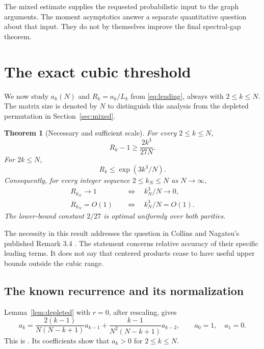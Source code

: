 \documentclass[11pt]{article}
\newtheorem{theorem}{Theorem}[section]
\theoremstyle{definition}
\theoremstyle{remark}
\newcommand{\1}{\mathbf 1}
\begin{document}
The mixed estimate supplies the requested probabilistic input to the graph arguments. The moment asymptotics answer a separate quantitative question about that input. They do not by themselves improve the final spectral-gap theorem.


\clearpage
\section{The exact cubic threshold}\label{sec:threshold}

We now study $a_k(N)$ and $R_k=a_k/L_k$ from \eqref{eq:leading}, always with $2\le k\le N$. The matrix size is denoted by $N$ to distinguish this analysis from the depleted permutation in Section~\ref{sec:mixed}.

\begin{theorem}[Necessary and sufficient scale]\label{thm:threshold}
For every $2\le k\le N$,
\begin{equation}\label{eq:lower}
R_k-1\ge\frac{2k^3}{27N}.
\end{equation}
For $2k\le N$,
\begin{equation}\label{eq:upper}
R_k\le\exp(3k^3/N).
\end{equation}
Consequently, for every integer sequence $2\le k_N\le N$ as $N\to\infty$,
\begin{align}
R_{k_N}\to1&\quad\Longleftrightarrow\quad k_N^3/N\to0,\label{eq:iff}\\
R_{k_N}=O(1)&\quad\Longleftrightarrow\quad k_N^3/N=O(1).\label{eq:bounded}
\end{align}
The lower-bound constant $2/27$ is optimal uniformly over both parities.
\end{theorem}

The necessity in this result addresses the question in Collins and Nagatsu's published Remark 3.4 \cite{CN}. The statement concerns relative accuracy of their specific leading terms. It does not say that centered products cease to have useful upper bounds outside the cubic range.

\subsection{The known recurrence and its normalization}

Lemma~\ref{lem:depleted} with $r=0$, after rescaling, gives
\begin{equation}\label{eq:momentrec}
a_k=\frac{2(k-1)}{N(N-k+1)}a_{k-1}
+\frac{k-1}{N^2(N-k+1)}a_{k-2},
\qquad a_0=1,\quad a_1=0.
\end{equation}
This is \cite[equation (16)]{CN}. Its coefficients show that $a_k>0$ for $2\le k\le N$.
\end{document}
